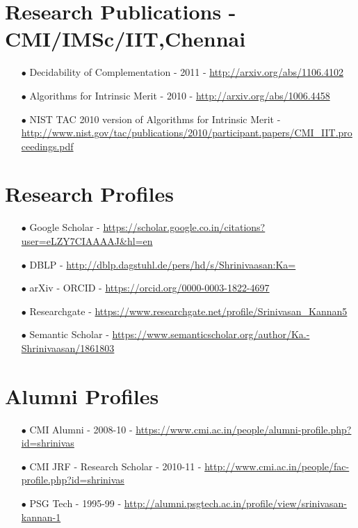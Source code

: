 \documentclass[11pt,onecolumn]{article}
\begin{document}
\section{Research Publications - CMI/IMSc/IIT,Chennai}
\begin{enumerate}
\item[$\bullet$] Decidability of Complementation - 2011 - \url {http://arxiv.org/abs/1106.4102}
\item[$\bullet$] Algorithms for Intrinsic Merit - 2010 - \url {http://arxiv.org/abs/1006.4458}
\item[$\bullet$] NIST TAC 2010 version of Algorithms for Intrinsic Merit - \\
 \url {http://www.nist.gov/tac/publications/2010/participant.papers/CMI_IIT.proceedings.pdf}
\end{enumerate}

\section{Research Profiles}
\begin{enumerate}
\item[$\bullet$] Google Scholar - \url {https://scholar.google.co.in/citations?user=eLZY7CIAAAAJ&hl=en }
\item[$\bullet$] DBLP - \url {http://dblp.dagstuhl.de/pers/hd/s/Shrinivaasan:Ka=}
\item[$\bullet$] arXiv - ORCID - \url {https://orcid.org/0000-0003-1822-4697}
\item[$\bullet$] Researchgate - \url {https://www.researchgate.net/profile/Srinivasan_Kannan5}
\item[$\bullet$] Semantic Scholar - \url {https://www.semanticscholar.org/author/Ka.-Shrinivaasan/1861803}
\end{enumerate}

\section{Alumni Profiles}
\begin{enumerate}
\item[$\bullet$] CMI Alumni - 2008-10 - \url {https://www.cmi.ac.in/people/alumni-profile.php?id=shrinivas}
\item[$\bullet$] CMI JRF - Research Scholar - 2010-11 - \url {http://www.cmi.ac.in/people/fac-profile.php?id=shrinivas}
\item[$\bullet$] PSG Tech - 1995-99 - \url {http://alumni.psgtech.ac.in/profile/view/srinivasan-kannan-1}
\end{enumerate}
\end{document}
